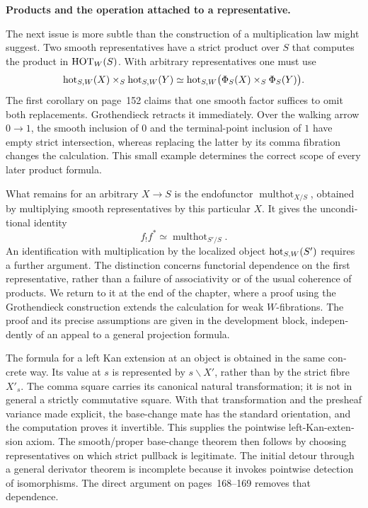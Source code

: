\begin{otherlanguage}{english}
\medskip\noindent\textbf{Products and the operation attached to a representative.}

The next issue is more subtle than the construction of a multiplication law might suggest. Two smooth representatives have a strict product over $S$ that computes the product in $\mathrm{HOT}_W(S)$. With arbitrary representatives one must use
\[
 \mathrm{hot}_{S,W}(X)\times_S\mathrm{hot}_{S,W}(Y)
 \simeq\mathrm{hot}_{S,W}\bigl(\Phi_S(X)\times_S\Phi_S(Y)\bigr).
\]
The first corollary on page~152 claims that one smooth factor suffices to omit both replacements. Grothendieck retracts it immediately. Over the walking arrow $0\to1$, the smooth inclusion of $0$ and the terminal-point inclusion of $1$ have empty strict intersection, whereas replacing the latter by its comma fibration changes the calculation. This small example determines the correct scope of every later product formula.

What remains for an arbitrary $X\to S$ is the endofunctor $\operatorname{multhot}_{X/S}$, obtained by multiplying smooth representatives by this particular $X$. It gives the unconditional identity
\[
 f_!f^*\simeq\operatorname{multhot}_{S'/S}.
\]
An identification with multiplication by the localized object $\mathrm{hot}_{S,W}(S')$ requires a further argument. The distinction concerns functorial dependence on the first representative, rather than a failure of associativity or of the usual coherence of products. We return to it at the end of the chapter, where a proof using the Grothendieck construction extends the calculation for weak $W$-fibrations. The proof and its precise assumptions are given in the development block, independently of an appeal to a general projection formula.

The formula for a left Kan extension at an object is obtained in the same concrete way. Its value at $s$ is represented by $s\backslash X'$, rather than by the strict fibre $X'_s$. The comma square carries its canonical natural transformation; it is not in general a strictly commutative square. With that transformation and the presheaf variance made explicit, the base-change mate has the standard orientation, and the computation proves it invertible. This supplies the pointwise left-Kan-extension axiom. The smooth/proper base-change theorem then follows by choosing representatives on which strict pullback is legitimate. The initial detour through a general derivator theorem is incomplete because it invokes pointwise detection of isomorphisms. The direct argument on pages~168--169 removes that dependence.


\end{otherlanguage}
